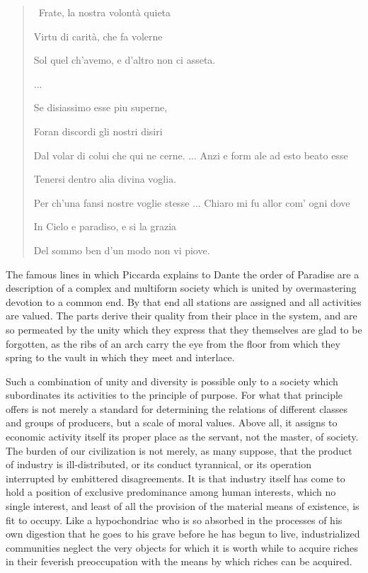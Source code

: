 \documentclass{book}
\begin{document}
\begin{quotation}\
	Frate, la nostra volontà quieta

	Virtu di carità, che fa volerne

	Sol quel ch’avemo, e d’altro non ci asseta.

	...

	Se disiassimo esse piu superne,

	Foran discordi gli nostri disiri

	Dal volar di colui che qui ne cerne. ... Anzi e form ale ad esto beato esse

	Tenersi dentro alia divina voglia.

	Per ch’una fansi nostre voglie stesse ... Chiaro mi fu allor com’ ogni dove

	In Cielo e paradiso, e si la grazia

	Del sommo ben d’un modo non vi piove.
\end{quotation}

The famous lines in which Piccarda explains to Dante the order of Paradise are a description of a complex and multiform society which is united by overmastering devotion to a common end. By that end all stations are assigned and all activities are valued. The parts derive their quality from their place in the system, and are so permeated by the unity which they express that they themselves are glad to be forgotten, as the ribs of an arch carry the eye from the floor from which they spring to the vault in which they meet and interlace.

Such a combination of unity and diversity is possible only to a society which subordinates its activities to the principle of purpose. For what that principle offers is not merely a standard for determining the relations of different classes and groups of producers, but a scale of moral values. Above all, it assigns to economic activity itself its proper place as the servant, not the master, of society. The burden of our civilization is not merely, as many suppose, that the product of industry is ill-distributed, or its conduct tyrannical, or its operation interrupted by embittered disagreements. It is that industry itself has come to hold a position of exclusive predominance among human interests, which no single interest, and least of all the provision of the material means of existence, is fit to occupy. Like a hypochondriac who is so absorbed in the processes of his own digestion that he goes to his grave before he has begun to live, industrialized communities neglect the very objects for which it is worth while to acquire riches in their feverish preoccupation with the means by which riches can be acquired.
\end{document}
